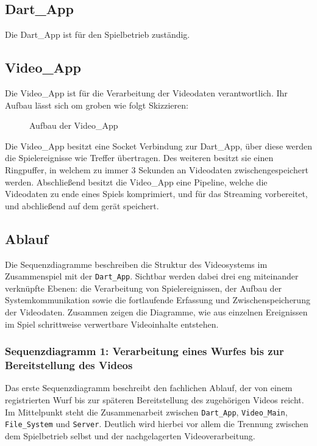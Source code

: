\subsection{Dart\_App}
Die Dart\_App ist für den Spielbetrieb zuständig.

\subsection{Video\_App}
Die Video\_App ist für die Verarbeitung der Videodaten verantwortlich. Ihr Aufbau lässt sich om groben wie folgt Skizzieren:

\begin{figure}
    \centering
    \caption{Aufbau der Video\_App}
    \label{fig:videoappaufbau}
\end{figure}

Die Video\_App besitzt eine Socket Verbindung zur Dart\_App, über diese werden die Spielereignisse wie Treffer übertragen. Des weiteren besitzt sie einen Ringpuffer, in welchem zu immer 3 Sekunden an Videodaten zwischengespeichert werden.
Abschließend besitzt die Video\_App eine Pipeline, welche die Videodaten zu ende eines Spiels komprimiert, und für das Streaming vorbereitet, und abchließend auf dem gerät speichert.

\subsection{Ablauf}

Die Sequenzdiagramme beschreiben die Struktur des Videosystems im Zusammenspiel mit der \texttt{Dart\_App}. Sichtbar werden dabei drei eng miteinander verknüpfte Ebenen: die Verarbeitung von Spielereignissen, der Aufbau der Systemkommunikation 
sowie die fortlaufende Erfassung und Zwischenspeicherung der Videodaten. Zusammen zeigen die Diagramme, wie aus einzelnen Ereignissen im Spiel schrittweise verwertbare Videoinhalte entstehen.

\subsubsection{Sequenzdiagramm 1: Verarbeitung eines Wurfes bis zur Bereitstellung des Videos}

Das erste Sequenzdiagramm beschreibt den fachlichen Ablauf, der von einem registrierten Wurf bis zur späteren Bereitstellung des zugehörigen Videos reicht. Im Mittelpunkt steht die Zusammenarbeit zwischen \texttt{Dart\_App}, \texttt{Video\_Main}, \texttt{File\_System} und \texttt{Server}. 
Deutlich wird hierbei vor allem die Trennung zwischen dem Spielbetrieb selbst und der nachgelagerten Videoverarbeitung.

